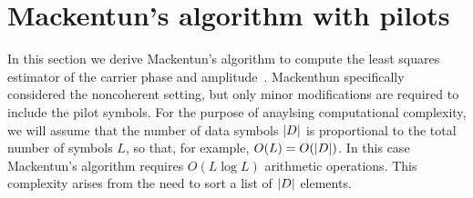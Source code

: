 \documentclass[journal]{IEEEtran}
\begin{document}

\section{Mackentun's algorithm with pilots}\label{sec:least-squar-estim}

In this section we derive Mackentun's algorithm to compute the least squares estimator of the carrier phase and amplitude~\cite{Mackenthun1994}.  Mackenthun specifically considered the noncoherent setting, but only minor modifications are required to include the pilot symbols.  For the purpose of anaylsing computational complexity, we will assume that the number of data symbols ${\left\vert D \right\vert}$ is proportional to the total number of symbols $L$, so that, for example, $O(L) = O({\left\vert D \right\vert})$.  In this case Mackentun's algorithm requires $O(L \log L)$ arithmetic operations.  This complexity arises from the need to sort a list of ${\left\vert D \right\vert}$ elements.  

\end{document}
